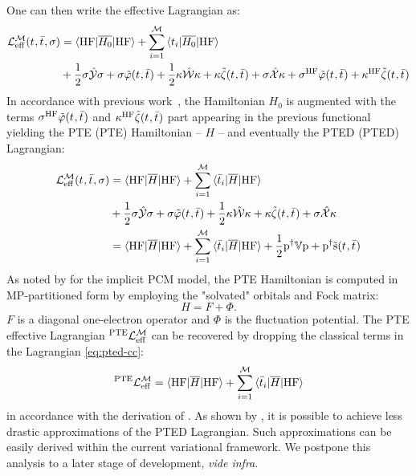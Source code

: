 One can then write the effective Lagrangian as:
\begin{equation}
  \begin{aligned}
  \mathcal{L}^\mathcal{M}_\mathrm{eff}(t_{}, \bar{t}_{}, \sigma) &=
  \braket{\mathrm{HF} | \overline{H_0} | \mathrm{HF}}
  + \sum_{i=1}^{\mathcal{M}}\braket{t_{i} | \overline{H_0} | \mathrm{HF}} \\
  &+ \frac{1}{2}\sigma\hat{\mathcal{Y}}\sigma
  + \sigma\tilde{\varphi}(t_{}, \bar{t}_{})
  + \frac{1}{2}\kappa\hat{\mathcal{W}}\kappa
  + \kappa\tilde{\zeta}(t_{}, \bar{t}_{})
  + \sigma\hat{\mathcal{X}}\kappa
  + \sigma^\mathrm{HF}\tilde{\varphi}(t_{}, \bar{t}_{})
  + \kappa^\mathrm{HF}\tilde{\zeta}(t_{}, \bar{t}_{})
  \end{aligned}
\end{equation}
In accordance with previous work~\cite{Cammi2009-gu, Caricato2011-tx}, the
Hamiltonian $H_0$ is augmented with the terms
$\sigma^\mathrm{HF}\tilde{\varphi}(t_{}, \bar{t}_{})$ and
$\kappa^\mathrm{HF}\tilde{\zeta}(t_{}, \bar{t}_{})$
part appearing in the previous functional yielding the \acl{PTE} (\acs{PTE}) Hamiltonian --
$H$ -- and
eventually the \acl{PTED} (\acs{PTED}) Lagrangian:
\begin{equation}\label{eq:pted-cc}
  \begin{aligned}
  \mathcal{L}^\mathcal{M}_\mathrm{eff}(t_{}, \bar{t}_{}, \sigma) &=
  \braket{\mathrm{HF} | \overline{H} | \mathrm{HF}}
  + \sum_{i=1}^{\mathcal{M}}\braket{\bar{t}_{i} | \overline{H} | \mathrm{HF}} \\
  &+ \frac{1}{2}\sigma\hat{\mathcal{Y}}\sigma
  + \sigma\tilde{\varphi}(t_{}, \bar{t}_{})
  + \frac{1}{2}\kappa\hat{\mathcal{W}}\kappa
  + \kappa\tilde{\zeta}(t_{}, \bar{t}_{})
  + \sigma\hat{\mathcal{X}}\kappa \\
  &=
  \braket{\mathrm{HF} | \overline{H} | \mathrm{HF}}
  + \sum_{i=1}^{\mathcal{M}}\braket{\bar{t}_{i} | \overline{H} | \mathrm{HF}}
  + \frac{1}{2}\mathrm{p}^\dagger\mathbb{V}\mathrm{p} + \mathrm{p}^\dagger\tilde{\mathrm{s}}(t_{},\bar{t}_{})
  \end{aligned}
\end{equation}
As noted by \citeauthor{Cammi2009-gu} for the implicit \acs{PCM} model,
the \acs{PTE} Hamiltonian is computed in \acs{MP}-partitioned form by
employing the "solvated" orbitals and Fock matrix:
\begin{equation}
  H = F + \Phi.
\end{equation}
$F$ is a diagonal one-electron operator and $\Phi$ is the
fluctuation potential.
The \acs{PTE} effective Lagrangian ${}^\mathrm{PTE}\mathcal{L}^\mathcal{M}_\mathrm{eff}$ can be
recovered by dropping the classical terms in the Lagrangian
\eqref{eq:pted-cc}:
\begin{equation}
{}^\mathrm{PTE}\mathcal{L}^\mathcal{M}_\mathrm{eff}
  =
  \braket{\mathrm{HF} | \overline{H} | \mathrm{HF}}
  + \sum_{i=1}^{\mathcal{M}}\braket{\bar{t}_{i} | \overline{H} | \mathrm{HF}}
\end{equation}
in accordance with the derivation of \citeauthor{Cammi2009-gu}.
As shown by \citeauthor{Caricato2011-tx}, it is possible to achieve less
drastic approximations of the \acs{PTED} Lagrangian. Such approximations
can be easily derived within the current variational framework. We
postpone this analysis to a later stage of development, \emph{vide
infra}.

